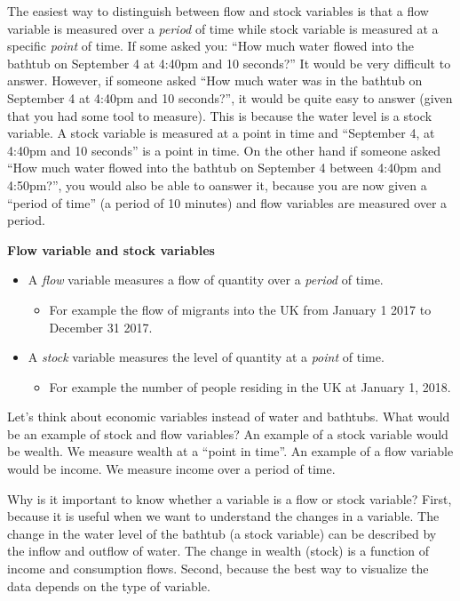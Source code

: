 \documentclass[]{book}
\providecommand{\tightlist}{%
  \setlength{\itemsep}{0pt}\setlength{\parskip}{0pt}}
\newenvironment{myblock}%
{%
 \begin{tcolorbox}%
}%
{\end{tcolorbox}}%
\begin{document}
The easiest way to distinguish between flow and stock variables is that a flow variable is measured over a \emph{period} of time while stock variable is measured at a specific \emph{point} of time. If some asked you: ``How much water flowed into the bathtub on September 4 at 4:40pm and 10 seconds?'' It would be very difficult to answer. However, if someone asked ``How much water was in the bathtub on September 4 at 4:40pm and 10 seconds?'', it would be quite easy to answer (given that you had some tool to measure). This is because the water level is a stock variable. A stock variable is measured at a point in time and ``September 4, at 4:40pm and 10 seconds'' is a point in time. On the other hand if someone asked ``How much water flowed into the bathtub on September 4 between 4:40pm and 4:50pm?'', you would also be able to oanswer it, because you are now given a ``period of time'' (a period of 10 minutes) and flow variables are measured over a period.

\begin{myblock}
\textbf{Flow variable and stock variables}

\begin{itemize}
\tightlist
\item
  A \emph{flow} variable measures a flow of quantity over a
  \emph{period} of time.

  \begin{itemize}
  \tightlist
  \item
    For example the flow of migrants into the UK from January 1 2017 to
    December 31 2017.
  \end{itemize}
\item
  A \emph{stock} variable measures the level of quantity at a
  \emph{point} of time.

  \begin{itemize}
  \tightlist
  \item
    For example the number of people residing in the UK at January 1,
    2018.
  \end{itemize}
\end{itemize}
\end{myblock}

Let's think about economic variables instead of water and bathtubs. What would be an example of stock and flow variables? An example of a stock variable would be wealth. We measure wealth at a ``point in time''. An example of a flow variable would be income. We measure income over a period of time.

Why is it important to know whether a variable is a flow or stock variable? First, because it is useful when we want to understand the changes in a variable. The change in the water level of the bathtub (a stock variable) can be described by the inflow and outflow of water. The change in wealth (stock) is a function of income and consumption flows. Second, because the best way to visualize the data depends on the type of variable.
\end{document}
